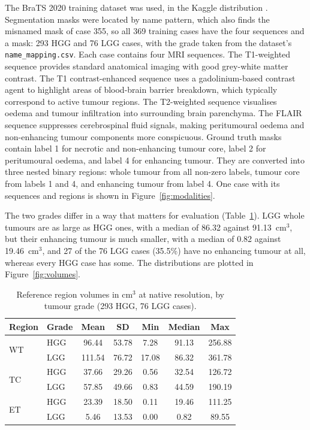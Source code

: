 \documentclass[final,3p,times,number]{elsarticle}
\begin{document}
The BraTS 2020 training dataset \cite{ref2,ref5} was used, in the Kaggle distribution . Segmentation masks were located by name pattern, which also finds the misnamed mask of case 355, so all 369 training cases have the four sequences and a mask: 293 HGG and 76 LGG cases, with the grade taken from the dataset's \texttt{name\_mapping.csv}. Each case contains four MRI sequences. The T1-weighted sequence provides standard anatomical imaging with good grey-white matter contrast. The T1 contrast-enhanced sequence uses a gadolinium-based contrast agent to highlight areas of blood-brain barrier breakdown, which typically correspond to active tumour regions. The T2-weighted sequence visualises oedema and tumour infiltration into surrounding brain parenchyma. The FLAIR sequence suppresses cerebrospinal fluid signals, making peritumoural oedema and non-enhancing tumour components more conspicuous. Ground truth masks contain label 1 for necrotic and non-enhancing tumour core, label 2 for peritumoural oedema, and label 4 for enhancing tumour. They are converted into three nested binary regions: whole tumour from all non-zero labels, tumour core from labels 1 and 4, and enhancing tumour from label 4. One case with its sequences and regions is shown in Figure~\ref{fig:modalities}.

The two grades differ in a way that matters for evaluation (Table~\ref{tab:volumes}). LGG whole tumours are as large as HGG ones, with a median of 86.32 against 91.13~cm$^3$, but their enhancing tumour is much smaller, with a median of 0.82 against 19.46~cm$^3$, and 27 of the 76 LGG cases (35.5\%) have no enhancing tumour at all, whereas every HGG case has some. The distributions are plotted in Figure~\ref{fig:volumes}.

\begin{table}[htbp]
\centering
\caption{Reference region volumes in cm$^3$ at native resolution, by tumour grade (293 HGG, 76 LGG cases).}
\label{tab:volumes}
\small
\begin{tabular*}{\textwidth}{@{\extracolsep{\fill}}llccccc@{}}
\toprule
Region & Grade & Mean & SD & Min & Median & Max \\
\midrule
\multirow{2}{*}{WT} & HGG & 96.44 & 53.78 & 7.28 & 91.13 & 256.88 \\
 & LGG & 111.54 & 76.72 & 17.08 & 86.32 & 361.78 \\
\multirow{2}{*}{TC} & HGG & 37.66 & 29.26 & 0.56 & 32.54 & 126.72 \\
 & LGG & 57.85 & 49.66 & 0.83 & 44.59 & 190.19 \\
\multirow{2}{*}{ET} & HGG & 23.39 & 18.50 & 0.11 & 19.46 & 111.25 \\
 & LGG & 5.46 & 13.53 & 0.00 & 0.82 & 89.55 \\
\bottomrule
\end{tabular*}
\end{table}
\end{document}

